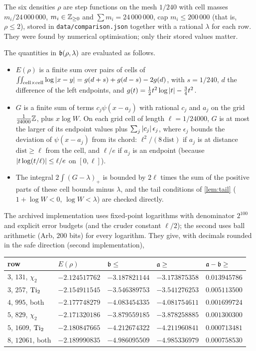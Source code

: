 The six densities $\rho$ are step functions on the mesh $1/240$ with cell masses $m_i/24\,000\,000$,
$m_i\in\mathbb{Z}_{\ge0}$ and $\sum m_i=24\,000\,000$, cap $m_i\le200\,000$ (that is, $\rho\le2$), stored in \texttt{data/comparison.json} together with a rational $\lambda$
for each row. They were found by numerical optimisation; only their stored values matter.

The quantities in $\mathfrak{b}(\rho,\lambda)$ are evaluated as follows.
\begin{itemize}
\item $E(\rho)$ is a finite sum over pairs of cells of
$\iint_{\text{cell}\times\text{cell}}\log\left\lvert x-y\right\rvert=g(d+s)+g(d-s)-2g(d)$, with $s=1/240$, $d$ the
difference of the left endpoints, and $g(t)=\frac12t^2\log\left\lvert t\right\rvert-\frac34t^2$.
\item $G$ is a finite sum of terms $c_j\psi(x-a_j)$ with rational $c_j$ and $a_j$ on the grid
$\frac1{24000}\mathbb{Z}$, plus $x\log W$. On each grid cell of length $\ell=1/24000$, $G$ is at most the
larger of its endpoint values plus $\sum_j\left\lvert c_j\right\rvert\epsilon_j$, where $\epsilon_j$ bounds the
deviation of $\psi(x-a_j)$ from its chord: $\ell^2/(8\,\mathrm{dist})$ if $a_j$ is at distance
$\mathrm{dist}\ge\ell$ from the cell, and $\ell/e$ if $a_j$ is an endpoint (because
$\left\lvert t\log(t/\ell)\right\rvert\le\ell/e$ on $[0,\ell]$).
\item The integral $2\int(G-\lambda)_+$ is bounded by $2\ell$ times the sum of the positive parts
of these cell bounds minus $\lambda$, and the tail conditions of \cref{lem:tail}
($1+\log W<0$, $\log W<\lambda$) are checked directly.
\end{itemize}
The archived implementation uses fixed-point logarithms with denominator $2^{100}$ and explicit
error budgets (and the cruder constant $\ell/2$); the second uses ball arithmetic (Arb, $200$ bits)
for every logarithm. They give, with decimals rounded in the safe direction (second implementation),
\begin{center}
\small
\begin{tabular}{@{}lllll@{}}
\toprule
row & $E(\rho)$ & $\mathfrak{b}\le$ & $\mathfrak{a}\ge$ & $\mathfrak{a}-\mathfrak{b}\ge$\\
\midrule
$3$, $131$, $\chi_2$ & $-2.124517762$ & $-3.187821144$ & $-3.173875358$ & $0.013945786$\\
$3$, $257$, $\operatorname{Ti}_2$ & $-2.154911545$ & $-3.546389753$ & $-3.541276253$ & $0.005113500$\\
$4$, $995$, both & $-2.177748279$ & $-4.083454335$ & $-4.081754611$ & $0.001699724$\\
$5$, $829$, $\chi_2$ & $-2.171320186$ & $-3.879559185$ & $-3.878258885$ & $0.001300300$\\
$5$, $1609$, $\operatorname{Ti}_2$ & $-2.180847665$ & $-4.212674322$ & $-4.211960841$ & $0.000713481$\\
$8$, $12061$, both & $-2.189990835$ & $-4.986095509$ & $-4.985336979$ & $0.000758530$\\
\bottomrule
\end{tabular}
\end{center}
